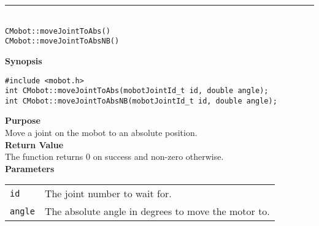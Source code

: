 \noindent
\vspace{5pt}
\rule{4.5in}{0.015in}\\
\noindent
{\LARGE \texttt{CMobot::moveJointToAbs()}}\\
{\LARGE \texttt{CMobot::moveJointToAbsNB()}}\\
{}

\noindent
{\bf Synopsis}
\vspace{-8pt}
\begin{verbatim}
#include <mobot.h>
int CMobot::moveJointToAbs(mobotJointId_t id, double angle);
int CMobot::moveJointToAbsNB(mobotJointId_t id, double angle);
\end{verbatim}

\noindent
{\bf Purpose}\\
Move a joint on the mobot to an absolute position.\\

\noindent
{\bf Return Value}\\
The function returns 0 on success and non-zero otherwise.\\

\noindent
{\bf Parameters}\\
\vspace{-0.1in}
\begin{description}
\item               
\begin{tabular}{p{10 mm}p{145 mm}}
\texttt{id} & The joint number to wait for. \\
\texttt{angle} & The absolute angle in degrees to move the motor to.  \\
\end{tabular}
\end{description}

